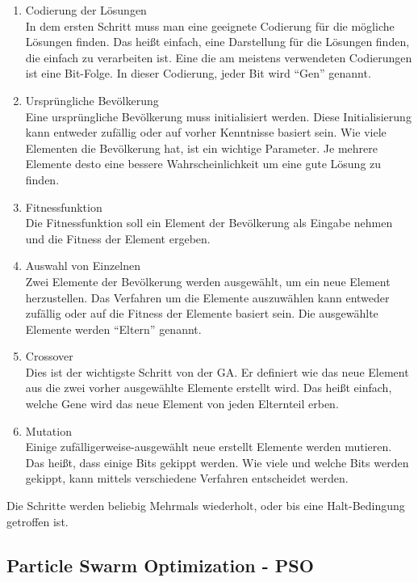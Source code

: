 \documentclass[twoside,twocolumn]{article}
\begin{document}
\begin{enumerate}
\item Codierung der Lösungen\\
In dem ersten Schritt muss man eine geeignete Codierung für die mögliche Lösungen finden. Das heißt einfach, eine Darstellung für die Lösungen finden, die einfach zu verarbeiten ist. Eine die am meistens verwendeten Codierungen ist eine Bit-Folge. In dieser Codierung, jeder Bit wird ``Gen'' genannt.\\
\item Ursprüngliche Bevölkerung\\
Eine ursprüngliche Bevölkerung muss initialisiert werden. Diese Initialisierung kann entweder zufällig oder auf vorher Kenntnisse basiert sein. Wie viele Elementen die Bevölkerung hat, ist ein wichtige Parameter. Je mehrere Elemente desto eine bessere Wahrscheinlichkeit um eine gute Lösung zu finden.
\item Fitnessfunktion\\
Die Fitnessfunktion soll ein Element der Bevölkerung als Eingabe nehmen und die Fitness der Element ergeben.
\item Auswahl von Einzelnen\\
Zwei Elemente der Bevölkerung werden ausgewählt, um ein neue Element herzustellen. Das Verfahren um die Elemente auszuwählen kann entweder zufällig oder auf die Fitness der Elemente basiert sein. Die ausgewählte Elemente werden ``Eltern'' genannt.
\item Crossover\\
Dies ist der wichtigste Schritt von der GA. Er definiert wie das neue Element aus die zwei vorher ausgewählte Elemente erstellt wird. Das heißt einfach, welche Gene wird das neue Element von jeden Elternteil erben.
\item Mutation\\
Einige zufälligerweise-ausgewählt neue erstellt Elemente werden mutieren. Das heißt, dass einige Bits gekippt werden. Wie viele und welche Bits werden gekippt, kann mittels verschiedene Verfahren entscheidet werden.
\end{enumerate}

Die Schritte werden beliebig Mehrmals wiederholt, oder bis eine Halt-Bedingung getroffen ist.

\subsection{Particle Swarm Optimization - PSO}
\blindtext %
\end{document}

